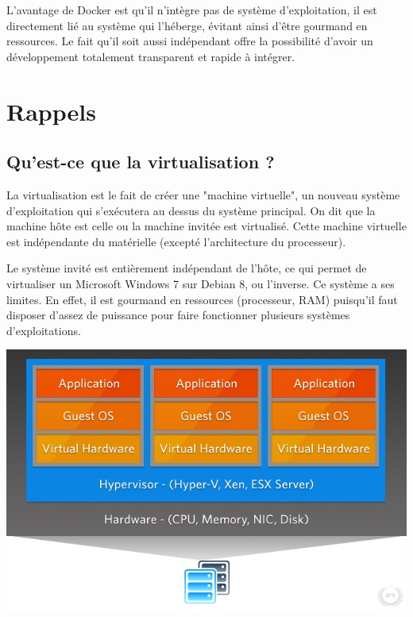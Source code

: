 \documentclass[12pt,a4paper]{article}
\begin{document}
L'avantage de Docker est qu'il n'intègre pas de système d'exploitation, il est directement lié au système qui l'héberge, évitant ainsi d'être gourmand en ressources. Le fait qu'il soit aussi indépendant offre la possibilité d'avoir un développement totalement transparent et rapide à intégrer. 

\section{Rappels}

\subsection{Qu'est-ce que la virtualisation ?}

La virtualisation est le fait de créer une "machine virtuelle", un nouveau système d'exploitation qui s'exécutera au dessus du système principal. On dit que la machine hôte est celle ou la machine invitée est virtualisé. Cette machine virtuelle est indépendante du matérielle (excepté l'architecture du processeur).

Le système invité est entièrement indépendant de l'hôte, ce qui permet de virtualiser un Microsoft Windows 7 sur Debian 8, ou l'inverse. Ce système a ses limites. En effet, il est gourmand en ressources (processeur, RAM) puisqu'il faut disposer d'assez de puissance pour faire fonctionner plusieurs systèmes d'exploitations.

\begin{center}
  \includegraphics[width=15cm]{images_rapport/virtualisation.jpg}
\end{center}
\end{document}
